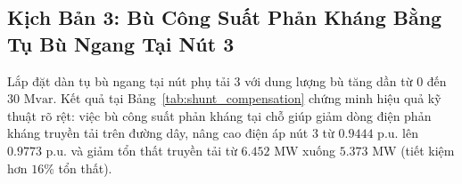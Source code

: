 \documentclass[12pt,a4paper,oneside]{report}
\begin{document}
\begin{table}[H]
\centering
\caption{Đáp ứng hệ thống khi điều chỉnh điện áp đặt tại nút máy phát 2.}
\label{tab:pv_tuning}
\end{table}

\subsection{Kịch Bản 3: Bù Công Suất Phản Kháng Bằng Tụ Bù Ngang Tại Nút 3}
Lắp đặt dàn tụ bù ngang tại nút phụ tải 3 với dung lượng bù tăng dần từ $0$ đến $30\text{ Mvar}$. Kết quả tại Bảng~\ref{tab:shunt_compensation} chứng minh hiệu quả kỹ thuật rõ rệt: việc bù công suất phản kháng tại chỗ giúp giảm dòng điện phản kháng truyền tải trên đường dây, nâng cao điện áp nút 3 từ $0.9444\text{ p.u.}$ lên $0.9773\text{ p.u.}$ và giảm tổn thất truyền tải từ $6.452\text{ MW}$ xuống $5.373\text{ MW}$ (tiết kiệm hơn $16\%$ tổn thất).

\begin{table}[H]
\centering
\caption{Hiệu quả kỹ thuật khi lắp đặt tụ bù ngang tại thanh cái phụ tải 3.}
\label{tab:shunt_compensation}
\end{table}
\end{document}

